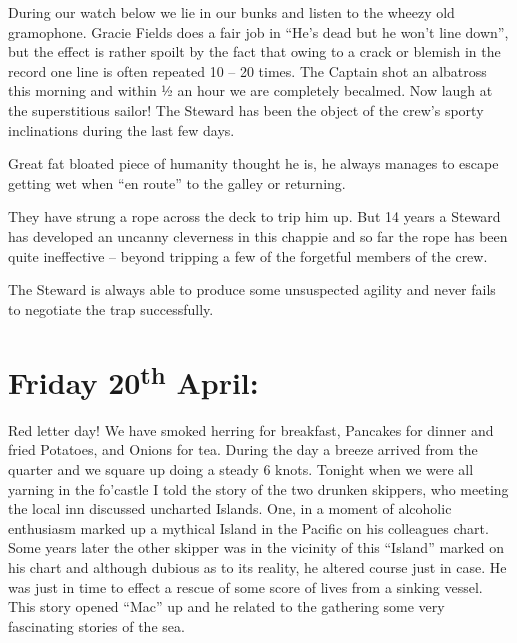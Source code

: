 \documentclass[
  11pt,
  msmallroyalvopaper
]{memoir}
\begin{document}
During our watch below we lie in our bunks and listen to the wheezy old
gramophone. Gracie Fields does a fair job in ``He's dead but he won't
line down'', but the effect is rather spoilt by the fact that owing to a
crack or blemish in the record one line is often repeated 10 -- 20
times. The Captain shot an albatross this morning and within ½ an hour
we are completely becalmed. Now laugh at the superstitious sailor! The
Steward has been the object of the crew's sporty inclinations during the
last few days.

Great fat bloated piece of humanity thought he is, he always manages to
escape getting wet when ``en route'' to the galley or returning.

They have strung a rope across the deck to trip him up. But 14 years a
Steward has developed an uncanny cleverness in this chappie and so far
the rope has been quite ineffective -- beyond tripping a few of the
forgetful members of the crew.

The Steward is always able to produce some unsuspected agility and never
fails to negotiate the trap successfully.

\hypertarget{friday-20th-april}{%
\section{\texorpdfstring{Friday 20\textsuperscript{th}
April:}{Friday 20th April:}}\label{friday-20th-april}}

Red letter day! We have smoked herring for breakfast, Pancakes for
dinner and fried Potatoes, and Onions for tea. During the day a breeze
arrived from the quarter and we square up doing a steady 6 knots.
Tonight when we were all yarning in the fo'castle I told the story of
the two drunken skippers, who meeting the local inn discussed uncharted
Islands. One, in a moment of alcoholic enthusiasm marked up a mythical
Island in the Pacific on his colleagues chart. Some years later the
other skipper was in the vicinity of this ``Island'' marked on his chart
and although dubious as to its reality, he altered course just in case.
He was just in time to effect a rescue of some score of lives from a
sinking vessel. This story opened ``Mac'' up and he related to the
gathering some very fascinating stories of the sea.
\end{document}
